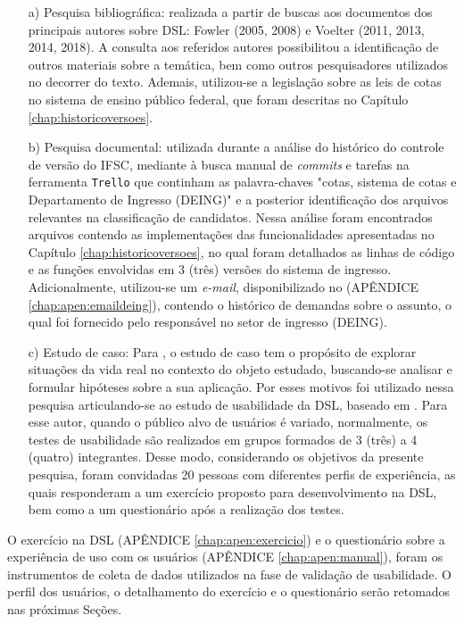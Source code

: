 \begin{enumerate}
    \item[a)] Pesquisa bibliográfica: realizada a partir de buscas aos documentos dos principais autores sobre \gls{DSL}: Fowler (2005, 2008) e Voelter (2011, 2013, 2014, 2018). A consulta aos referidos autores possibilitou a identificação de outros materiais sobre a temática, bem como outros pesquisadores utilizados no decorrer do texto. Ademais, utilizou-se a legislação sobre as leis de cotas no sistema de ensino público federal, que foram descritas no Capítulo \ref{chap:historicoversoes}. 

    
    \item[b)] Pesquisa documental: utilizada durante a análise do histórico do controle de versão do \gls{IFSC}, mediante à busca manual de \textit{commits} e tarefas na ferramenta \texttt{Trello} que continham as palavra-chaves "cotas, sistema de cotas e Departamento de Ingresso (DEING)" e a posterior identificação dos arquivos relevantes na classificação de candidatos. Nessa análise foram encontrados arquivos contendo as implementações das funcionalidades apresentadas no Capítulo \ref{chap:historicoversoes}, no qual foram detalhados as linhas de código e as funções envolvidas em 3 (três) versões do sistema de ingresso. Adicionalmente, utilizou-se um \textit{e-mail}, disponibilizado no (APÊNDICE \ref{chap:apen:emaildeing}), contendo o histórico de demandas sobre o assunto, o qual foi fornecido pelo responsável no setor de ingresso (DEING).
    
    \item[c)] Estudo de caso: Para , o estudo de caso tem o propósito de explorar situações da vida real no contexto do objeto estudado, buscando-se analisar e formular hipóteses sobre a sua aplicação. Por esses motivos foi utilizado nessa pesquisa articulando-se ao estudo de usabilidade da \gls{DSL}, baseado em . Para esse autor, quando o público alvo de usuários é variado, normalmente, os testes de usabilidade são realizados em grupos formados de 3 (três) a 4 (quatro) integrantes. Desse modo, considerando os objetivos da presente pesquisa, foram convidadas 20 pessoas com diferentes perfis de experiência, as quais responderam a um exercício proposto para desenvolvimento na \gls{DSL}, bem como a um questionário após a realização dos testes. 
    
\end{enumerate}

    O exercício na DSL (APÊNDICE \ref{chap:apen:exercicio}) e o questionário sobre a experiência de uso com os usuários (APÊNDICE \ref{chap:apen:manual}), foram os instrumentos de coleta de dados utilizados na fase de validação de usabilidade. O perfil dos usuários, o detalhamento do exercício e o questionário serão retomados nas próximas Seções.
    
